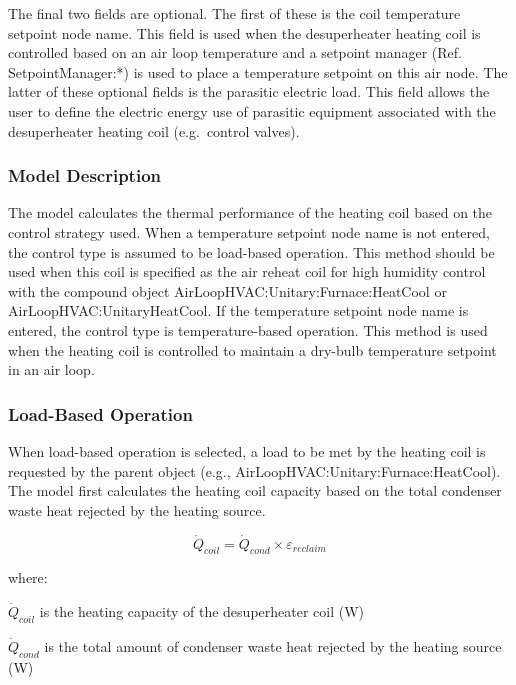 The final two fields are optional. The first of these is the coil temperature setpoint node name. This field is used when the desuperheater heating coil is controlled based on an air loop temperature and a setpoint manager (Ref. SetpointManager:*) is used to place a temperature setpoint on this air node. The latter of these optional fields is the parasitic electric load. This field allows the user to define the electric energy use of parasitic equipment associated with the desuperheater heating coil (e.g.~control valves).

\subsubsection{Model Description}\label{model-description-6}

The model calculates the thermal performance of the heating coil based on the control strategy used. When a temperature setpoint node name is not entered, the control type is assumed to be load-based operation. This method should be used when this coil is specified as the air reheat coil for high humidity control with the compound object AirLoopHVAC:Unitary:Furnace:HeatCool or AirLoopHVAC:UnitaryHeatCool. If the temperature setpoint node name is entered, the control type is temperature-based operation. This method is used when the heating coil is controlled to maintain a dry-bulb temperature setpoint in an air loop.

\subsubsection{Load-Based Operation}\label{load-based-operation}

When load-based operation is selected, a load to be met by the heating coil is requested by the parent object (e.g., AirLoopHVAC:Unitary:Furnace:HeatCool). The model first calculates the heating coil capacity based on the total condenser waste heat rejected by the heating source.

\begin{equation}
{\dot Q_{coil}} = {\dot Q_{cond}} \times {\varepsilon_{reclaim}}
\end{equation}

where:

\({\dot Q_{coil}}\) is the heating capacity of the desuperheater coil (W)

\({\dot Q_{cond}}\) is the total amount of condenser waste heat rejected by the heating source (W)

